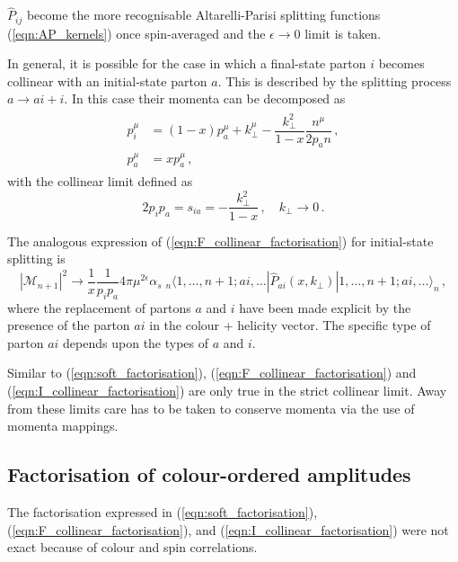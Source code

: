 \documentclass[main.tex]{subfiles}
\begin{document}
    $\hat{P}_{ij}$ become the more recognisable Altarelli-Parisi
    splitting functions (\ref{eqn:AP_kernels}) once spin-averaged
    and the $\epsilon \rightarrow 0$ limit is taken.

    In general, it is possible for the case in which a final-state
    parton $i$ becomes collinear with an initial-state parton $a$.
    This is described by the splitting process $a \rightarrow ai + i$.
    In this case their momenta can be decomposed as
    \begin{align}\label{eqn:I_collinear_momenta}
        \begin{split}
        p_{i}^{\mu} &= (1-x)p_{a}^{\mu} + k_{\perp}^{\mu} - \dfrac{k_{\perp}^{2}}{1-x}\dfrac{n^{\mu}}{2p_{a} n} \, , \\
        p_{a}^{\mu} &= x p_{a}^{\mu} \, ,
        \end{split}
    \end{align}
    with the collinear limit defined as
    \begin{equation}\label{eqn:I_collinear_limit}
        2p_{i}p_{a} = s_{ia} = -\dfrac{k_{\perp}^{2}}{1-x} \, , \quad k_{\perp} \rightarrow 0 \, .
    \end{equation}

    The analogous expression of (\ref{eqn:F_collinear_factorisation})
    for initial-state splitting is
    \begin{equation}\label{eqn:I_collinear_factorisation}
        |\mathcal{M}_{n+1}|^{2} \rightarrow \dfrac{1}{x} \dfrac{1}{p_{i}p_{a}} 4\pi \mu^{2\epsilon} \alpha_{s} \; {}_{n} \langle 1,\ldots,n+1;ai, \ldots | \hat{P}_{ai}(x, k_{\perp}) | 1,\ldots,n+1;ai,\ldots \rangle_{n} \, ,
    \end{equation}
    where the replacement of partons $a$ and $i$ have been made
    explicit by the presence of the parton $ai$ in the colour + helicity vector.
    The specific type of parton $ai$ depends upon the types of $a$ and $i$.

    Similar to (\ref{eqn:soft_factorisation}), (\ref{eqn:F_collinear_factorisation})
     and (\ref{eqn:I_collinear_factorisation}) are only
    true in the strict collinear limit. Away from these
    limits care has to be taken to conserve momenta
    via the use of momenta mappings.

\subsection{Factorisation of colour-ordered amplitudes}
    The factorisation expressed in (\ref{eqn:soft_factorisation}),
    (\ref{eqn:F_collinear_factorisation}), and (\ref{eqn:I_collinear_factorisation})
    were not exact because of colour and spin correlations.
\end{document}
